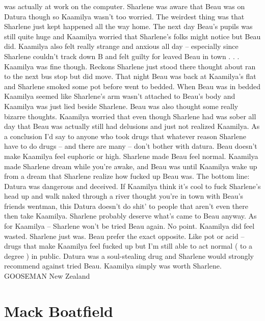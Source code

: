\documentclass[12pt]{book}
\begin{document}
was actually at work on the computer. Sharlene was aware that Beau was on Datura though so Kaamilya wasn't too worried. The weirdest thing was that Sharlene just kept happened all the way home. The next day Beau's pupils was still quite huge and Kaamilya worried that Sharlene's folks might notice but Beau did. Kaamilya also felt really strange and anxious all day -- especially since Sharlene couldn't track down B and felt guilty for leaved Beau in town . . .  Kaamilya was fine though. Reckons Sharlene just stood there thought about ran to the next bus stop but did move. That night Beau was back at Kaamilya's flat and Sharlene smoked some pot before went to bedded. When Beau was in bedded Kaamilya seemed like Sharlene's arm wasn't attached to Beau's body and Kaamilya was just lied beside Sharlene. Beau was also thought some really bizarre thoughts. Kaamilya worried that even though Sharlene had was sober all day that Beau was actually still had delusions and just not realized Kaamilya. As a conclusion I'd say to anyone who took drugs that whatever reason Sharlene have to do drugs -- and there are many -- don't bother with datura. Beau doesn't make Kaamilya feel euphoric or high. Sharlene made Beau feel normal. Kaamilya made Sharlene dream while you're awake, and Beau was until Kaamilya wake up from a dream that Sharlene realize how fucked up Beau was. The bottom line: Datura was dangerous and deceived. If Kaamilya think it's cool to fuck Sharlene's head up and walk naked through a river thought you're in town with Beau's friends wentman, this Datura doesn't do shit' to people that aren't even there then take Kaamilya. Sharlene probably deserve what's came to Beau anyway. As for Kaamilya -- Sharlene won't be tried Beau again. No point. Kaamilya did feel wasted. Sharlene just was. Beau prefer the exact opposite. Like pot or acid -- drugs that make Kaamilya feel fucked up but I'm still able to act normal ( to a degree ) in public. Datura was a soul-stealing drug and Sharlene would strongly recommend against tried Beau. Kaamilya simply was worth Sharlene. GOOSEMAN New Zealand



\chapter{Mack Boatfield}
\end{document}
